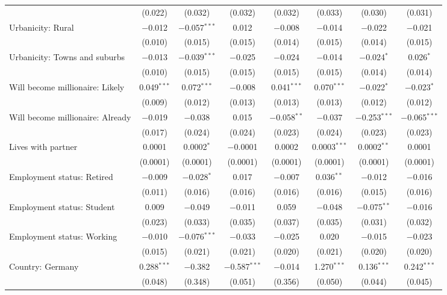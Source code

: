 \begin{tabular}{@{\extracolsep{5pt}}lccccccc}
  & (0.022) & (0.032) & (0.032) & (0.032) & (0.033) & (0.030) & (0.031) \\ 
  Urbanicity: Rural & $-$0.012 & $-$0.057$^{***}$ & 0.012 & $-$0.008 & $-$0.014 & $-$0.022 & $-$0.021 \\ 
  & (0.010) & (0.015) & (0.015) & (0.014) & (0.015) & (0.014) & (0.015) \\ 
  Urbanicity: Towns and suburbs & $-$0.013 & $-$0.039$^{***}$ & $-$0.025 & $-$0.024 & $-$0.014 & $-$0.024$^{*}$ & 0.026$^{*}$ \\ 
  & (0.010) & (0.015) & (0.015) & (0.015) & (0.015) & (0.014) & (0.014) \\ 
  Will become millionaire: Likely & 0.049$^{***}$ & 0.072$^{***}$ & $-$0.008 & 0.041$^{***}$ & 0.070$^{***}$ & $-$0.022$^{*}$ & $-$0.023$^{*}$ \\ 
  & (0.009) & (0.012) & (0.013) & (0.013) & (0.013) & (0.012) & (0.012) \\ 
  Will become millionaire: Already & $-$0.019 & $-$0.038 & 0.015 & $-$0.058$^{**}$ & $-$0.037 & $-$0.253$^{***}$ & $-$0.065$^{***}$ \\ 
  & (0.017) & (0.024) & (0.024) & (0.023) & (0.024) & (0.023) & (0.023) \\ 
  Lives with partner & 0.0001 & 0.0002$^{*}$ & $-$0.0001 & 0.0002 & 0.0003$^{***}$ & 0.0002$^{**}$ & 0.0001 \\ 
  & (0.0001) & (0.0001) & (0.0001) & (0.0001) & (0.0001) & (0.0001) & (0.0001) \\ 
  Employment status: Retired & $-$0.009 & $-$0.028$^{*}$ & 0.017 & $-$0.007 & 0.036$^{**}$ & $-$0.012 & $-$0.016 \\ 
  & (0.011) & (0.016) & (0.016) & (0.016) & (0.016) & (0.015) & (0.016) \\ 
  Employment status: Student & 0.009 & $-$0.049 & $-$0.011 & 0.059 & $-$0.048 & $-$0.075$^{**}$ & $-$0.016 \\ 
  & (0.023) & (0.033) & (0.035) & (0.037) & (0.035) & (0.031) & (0.032) \\ 
  Employment status: Working & $-$0.010 & $-$0.076$^{***}$ & $-$0.033 & $-$0.025 & 0.020 & $-$0.015 & $-$0.023 \\ 
  & (0.015) & (0.021) & (0.021) & (0.020) & (0.021) & (0.020) & (0.020) \\ 
  Country: Germany & 0.288$^{***}$ & $-$0.382 & $-$0.587$^{***}$ & $-$0.014 & 1.270$^{***}$ & 0.136$^{***}$ & 0.242$^{***}$ \\ 
  & (0.048) & (0.348) & (0.051) & (0.356) & (0.050) & (0.044) & (0.045) \\ 

\end{tabular}

